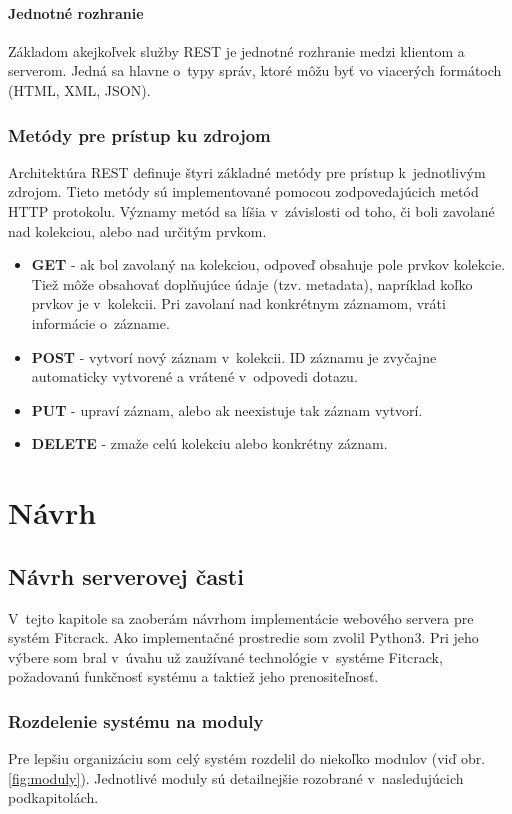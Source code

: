 \documentclass[slovak,cprint]{fitthesis} %
\begin{document}
\subsubsection{Jednotné rozhranie}
Základom akejkoľvek služby REST je jednotné rozhranie medzi klientom a serverom. Jedná sa hlavne o~typy správ, ktoré môžu byť vo viacerých formátoch (HTML, XML, JSON).

\subsection{Metódy pre prístup ku zdrojom}
Architektúra REST definuje štyri základné metódy pre prístup k~jednotlivým zdrojom. Tieto metódy sú implementované pomocou zodpovedajúcich metód HTTP protokolu. Významy metód sa líšia v~závislosti od toho, či boli zavolané nad kolekciou, alebo nad určitým prvkom.
\begin{itemize}
    \item \textbf{GET} - ak bol zavolaný na kolekciou, odpoveď obsahuje pole prvkov kolekcie. Tiež môže obsahovať doplňujúce údaje (tzv. metadata), napríklad koľko prvkov je v~kolekcii.
    Pri zavolaní nad konkrétnym záznamom, vráti informácie o~zázname.
    \item \textbf{POST} - vytvorí nový záznam v~kolekcii. ID záznamu je zvyčajne automaticky vytvorené a vrátené v~odpovedi dotazu.
    \item \textbf{PUT} - upraví záznam, alebo ak neexistuje tak záznam vytvorí.
    \item \textbf{DELETE} - zmaže celú kolekciu alebo konkrétny záznam.
\end{itemize}



\chapter{Návrh}\label{navrh}



\section{Návrh serverovej časti}\label{navrhServer}
V~tejto kapitole sa zaoberám návrhom implementácie webového servera pre systém Fitcrack. Ako implementačné prostredie som zvolil Python3. Pri jeho výbere som bral v~úvahu už zaužívané technológie v~systéme Fitcrack, požadovanú funkčnosť systému a taktiež jeho prenositeľnosť.

\subsection{Rozdelenie systému na moduly}
Pre lepšiu organizáciu som celý systém rozdelil do niekoľko modulov (viď obr. \ref{fig:moduly}). Jednotlivé moduly sú detailnejšie rozobrané v~nasledujúcich podkapitolách. 
\end{document}
